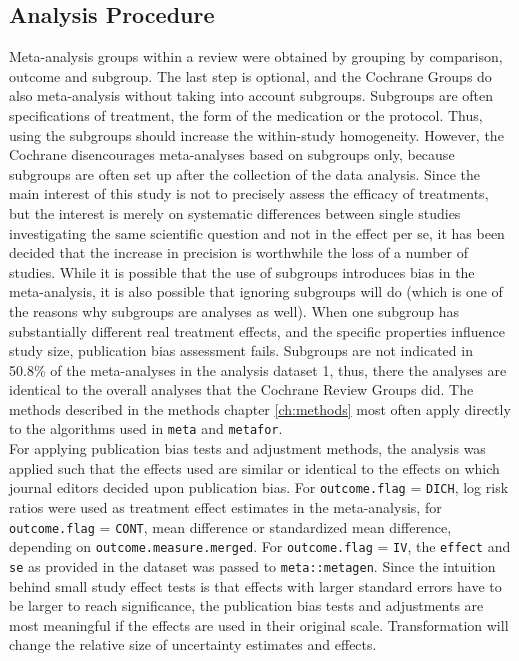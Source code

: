 \documentclass[11pt,a4paper,twoside]{book}\usepackage[]{graphicx}\usepackage[]{color}
\begin{document}
\subsection{Analysis Procedure} \label{sec:procedure}
Meta-analysis groups within a review were obtained by grouping by comparison, outcome and subgroup. The last step is optional, and the Cochrane Groups do also meta-analysis without taking into account subgroups. Subgroups are often specifications of treatment, \eg the form of the medication or the protocol. Thus, using the subgroups should increase the within-study homogeneity. However, the Cochrane disencourages meta-analyses based on subgroups only, because subgroups are often set up after the collection of the data analysis. Since the main interest of this study is not to precisely assess the efficacy of treatments, but the interest is merely on systematic differences between single studies investigating the same scientific question and not in the effect per se, it has been decided that the increase in precision is worthwhile the loss of a number of studies. While it is possible that the use of subgroups introduces bias in the meta-analysis, it is also possible that ignoring subgroups will do (which is one of the reasons why subgroups are analyses as well). When one subgroup has substantially different real treatment effects, and the specific properties influence study size, publication bias assessment fails. Subgroups are not indicated in 50.8\% of the meta-analyses in the analysis dataset 1, thus, there the analyses are identical to the overall analyses that the Cochrane Review Groups did.
The methods described in the methods chapter \ref{ch:methods} most often apply directly to the algorithms used in \texttt{meta} and \texttt{metafor}. \\
For applying publication bias tests and adjustment methods, the analysis was applied such that the effects used are similar or identical to the effects on which journal editors decided upon publication bias. For \texttt{outcome.flag} = \texttt{DICH}, log risk ratios were used as treatment effect estimates in the meta-analysis, for \texttt{outcome.flag} = \texttt{CONT}, mean difference or standardized mean difference, depending on \texttt{outcome.measure.merged}. For \texttt{outcome.flag} = \texttt{IV}, the \texttt{effect} and \texttt{se} as provided in the dataset was passed to \texttt{meta::metagen}. Since the intuition behind small study effect tests is that effects with larger standard errors have to be larger to reach significance, the publication bias tests and adjustments are most meaningful if the effects are used in their original scale. Transformation will change the relative size of uncertainty estimates and effects.\\ 
\end{document}
